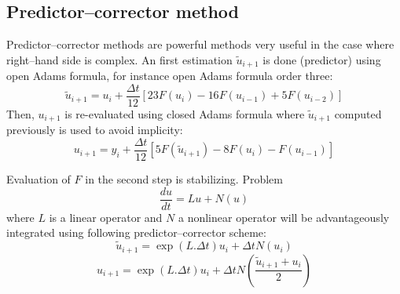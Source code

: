\documentclass[12pt]{book}
\begin{document}
\subsection{Predictor--corrector method}
Predictor--corrector methods 
are powerful methods very useful in the case where right--hand side is
complex. An first estimation $\tilde u_{i+1}$ is done (predictor) using open
Adams formula, for instance open Adams formula order three:
\begin{equation}
\tilde u_{i+1}=u_i+\frac{\Delta t}{12}[23F(u_i)-16F(u_{i-1})+5F(u_{i-2})]
\end{equation}
Then, $u_{i+1}$ is re-evaluated using closed Adams formula where $\tilde
u_{i+1}$ computed previously is used to avoid implicity:
\begin{equation}
u_{i+1}=y_i+\frac{\Delta t}{12}[5F(\tilde u_{i+1})-8F(u_{i})-F(u_{i-1})]
\end{equation}
\begin{rem}
Evaluation of $F$ in the second step is stabilizing. Problem
\begin{equation}
\frac{du}{dt}=Lu+N(u)
\end{equation}
where $L$ is a linear operator and $N$ a nonlinear operator will be
advantageously integrated using following predictor--corrector scheme:
\begin{equation}
\tilde u_{i+1}=\exp(L.\Delta t)u_i+\Delta t N(u_i)
\end{equation}
\begin{equation}
u_{i+1}=\exp(L.\Delta t)u_i+\Delta t N(\frac{\tilde u_{i+1}+u_i}{2})
\end{equation}
\end{rem}
\end{document}
